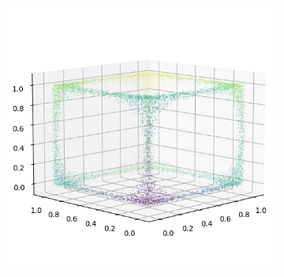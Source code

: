 \begin{figure}[ht!]
\begin{subfigure}[b]{0.25\textwidth}
    \end{subfigure}%
    \begin{subfigure}[b]{0.25\textwidth}
        \centering
        \includegraphics[width=0.9\linewidth]{python/plots/cube_points/data/matrix/cube_points_m24_n01}
    \end{subfigure}%



\end{figure}
